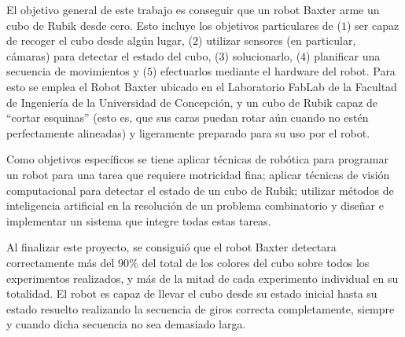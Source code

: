 El objetivo general de este trabajo es conseguir que un robot Baxter arme un cubo de Rubik desde cero. Esto incluye los objetivos particulares de ($1$) ser capaz de recoger el cubo desde algún lugar, ($2$) utilizar sensores (en particular, cámaras) para detectar el estado del cubo, ($3$) solucionarlo, ($4$) planificar una secuencia de movimientos y ($5$) efectuarlos mediante el hardware del robot. Para esto se emplea el Robot Baxter ubicado en el Laboratorio FabLab de la Facultad de Ingeniería de la Universidad de Concepción, y un cubo de Rubik capaz de ``cortar esquinas'' (esto es, que sus caras puedan rotar aún cuando no estén perfectamente alineadas) y ligeramente preparado para su uso por el robot.

Como objetivos específicos se tiene aplicar técnicas de robótica para programar un robot para una tarea que requiere motricidad fina; aplicar técnicas de visión computacional para detectar el estado de un cubo de Rubik; utilizar métodos de inteligencia artificial en la resolución de un problema combinatorio y diseñar e implementar un sistema que integre todas estas tareas.

Al finalizar este proyecto, se consiguió que el robot Baxter detectara correctamente más del 90\% del total de los colores del cubo sobre todos los experimentos realizados, y más de la mitad de cada experimento individual en su totalidad. El robot es capaz de llevar el cubo desde su estado inicial hasta su estado resuelto realizando la secuencia de giros correcta completamente, siempre y cuando dicha secuencia no sea demasiado larga.
